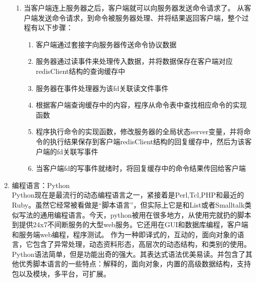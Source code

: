 \documentclass[proposal]{zjutreport}
\begin{document}
\begin{enumerate}[label=（\arabic*）]
{\begin{enumerate}[label=\arabic*.]
\item{
当客户端连上服务器之后，客户端就可以向服务器发送命令请求了。
从客户端发送命令请求，到命令被服务器处理、并将结果返回客户端，整个过程有以下步骤：
\begin{enumerate}[label=\Roman{*}.]
\item{客户端通过套接字向服务器传送命令协议数据}
\item{服务器通过读事件来处理传入数据，并将数据保存在客户端对应redisClient结构的查询缓存中}
\item{服务器在事件处理器为该fd关联读文件事件}
\item{根据客户端查询缓存中的内容，程序从命令表中查找相应命令的实现函数}
\item{程序执行命令的实现函数，修改服务器的全局状态server变量，并将命令的执行结果保存到客户端redisClient结构的回复缓存中，然后为该客户端的fd关联写事件}
\item{当客户端fd的写事件就绪时，将回复缓存中的命令结果传回给客户端}
\end{enumerate}
}
\end{enumerate}
}
\item{编程语言：Python\\
Python现在是最流行的动态编程语言之一，紧接着是Perl,Tcl,PHP和最近的Ruby。虽然它经常被看做是“脚本语言”，但实际上它是和List或者Smalltalk类似写法的通用编程语言。今天，python被用在很多地方，从使用完就扔的脚本到提供24x7不间断服务的大型web服务。它还用在GUI和数据库编程，客户端和服务端web编程，程序测试。
作为一种即译式的，互动的，面向对象的语言，它包含了异常处理，动态资料形态，高层次的动态结构，和类别的使用。Python语法简单，但是功能出奇的强大。其表达式语法优美易读。并包含了其他优秀脚本语言的一些特点：解释的，面向对象，内置的高级数据结构，支持包以及模块，多平台，可扩展。
}
\end{enumerate}

\newpage
\end{document}
